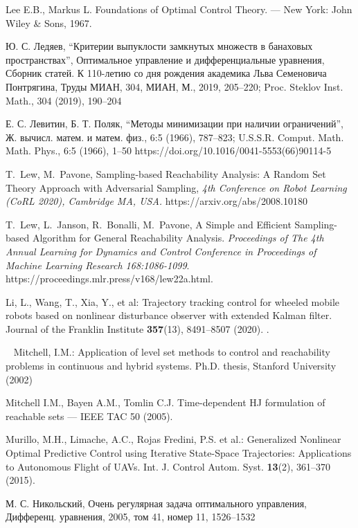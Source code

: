 \documentclass[../main.tex]{subfiles}
\begin{document}
\begin{thebibliography}{99}
Lee E.B., Markus L. Foundations of Optimal Control Theory. — New York: John Wiley \& Sons, 1967.

Ю. С. Ледяев, “Критерии выпуклости замкнутых множеств в банаховых пространствах”, Оптимальное управление и дифференциальные уравнения, Сборник статей. К 110-летию со дня рождения академика Льва Семеновича Понтрягина, Труды МИАН, 304, МИАН, М., 2019, 205–220; Proc. Steklov Inst. Math., 304 (2019), 190–204

Е. С. Левитин, Б. Т. Поляк, “Методы минимизации при наличии ограничений”, Ж. вычисл. матем. и матем. физ., 6:5 (1966), 787–823; U.S.S.R. Comput. Math. Math. Phys., 6:5 (1966), 1–50 https://doi.org/10.1016/0041-5553(66)90114-5

T.~Lew, M.~Pavone, Sampling-based Reachability Analysis: A Random Set Theory Approach with Adversarial Sampling, {\it 4th Conference on Robot Learning (CoRL 2020), Cambridge MA, USA.} https://arxiv.org/abs/2008.10180 

T.~Lew, L.~Janson, R.~Bonalli, M.~Pavone,  A Simple and Efficient Sampling-based Algorithm for General Reachability Analysis. {\it Proceedings of The 4th Annual Learning for Dynamics and Control Conference in Proceedings of Machine Learning Research
	168:1086-1099}. https://proceedings.mlr.press/v168/lew22a.html.

Li, L., Wang, T., Xia, Y., et al:  Trajectory tracking control for wheeled mobile robots based on nonlinear disturbance observer with extended Kalman filter. Journal of the Franklin Institute \textbf{357}(13), 8491--8507 (2020). .

Mitchell, I.M.: Application of level set methods to control and reachability problems in
continuous and hybrid systems. Ph.D. thesis, Stanford University (2002)

Mitchell I.M., Bayen A.M., Tomlin C.J. Time-dependent HJ formulation of reachable sets — IEEE TAC 50 (2005).

Murillo, M.H., Limache, A.C., Rojas Fredini, P.S. et al.: Generalized Nonlinear Optimal Predictive Control using Iterative State-Space
Trajectories: Applications to Autonomous Flight of UAVs. Int. J. Control Autom. Syst. \textbf{13}(2), 361--370 (2015).


М. С. Никольский, Очень регулярная задача оптимального управления, Дифференц. уравнения, 2005, том 41, номер 11, 1526–1532


\end{thebibliography}
\end{document}
